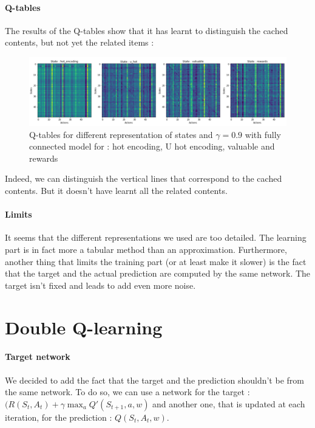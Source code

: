 \documentclass[a4paper]{article}
\begin{document}
        \paragraph{Q-tables} The results of the Q-tables show that it has learnt to distinguish the cached contents, but not yet the related items : 
        
            \begin{figure}[h!]
            \centering
            \includegraphics[scale = 0.3]{img/q_tables_fc_09.png}
            \caption{Q-tables for different representation of states and $\gamma = 0.9$ with fully connected model for : hot encoding, U hot encoding, valuable and rewards}
            \label{fig:my_label}
        \end{figure}
    Indeed, we can distinguish the vertical lines that correspond to the cached contents. But it doesn't have learnt all the related contents. 
    \paragraph{Limits} It seems that the different representations we used are too detailed. The learning part is in fact more a tabular method than an approximation. Furthermore, another thing that limits the training part (or at least make it slower) is the fact that the target and the actual prediction are computed by the same network. The target isn't fixed and leads to add even more noise.
    
\section{Double Q-learning}
\paragraph{Target network} We decided to add the fact that the target and the prediction shouldn't be from the same network. To do so, we can use a network for the target : $ (R(S_t, A_t) + \gamma \max_{a} Q'(S_{t+1}, a, w)$ and another one, that is updated at each iteration, for the prediction : $ Q(S_t , A_t,w)$. 
\end{document}
